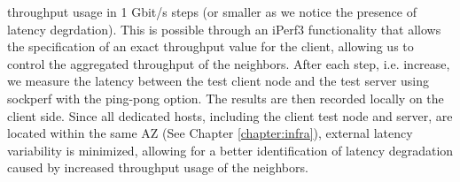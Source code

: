 throughput usage in 1 Gbit/s steps (or smaller as we notice the presence of latency degrdation).
This is possible through an iPerf3 functionality that allows the specification of an exact throughput 
value for the client, allowing us to control the aggregated throughput of the neighbors.
After each step, i.e. increase, we measure the latency between the test client node and 
the test server using sockperf with the ping-pong option. The results are then recorded locally on the 
client side. 
Since all dedicated hosts, including the client test node and server, are located within 
the same \ac{AZ} (See Chapter \ref{chapter:infra}),
external latency variability is minimized, allowing for a better identification of latency 
degradation caused by increased throughput usage of the neighbors. \\ 